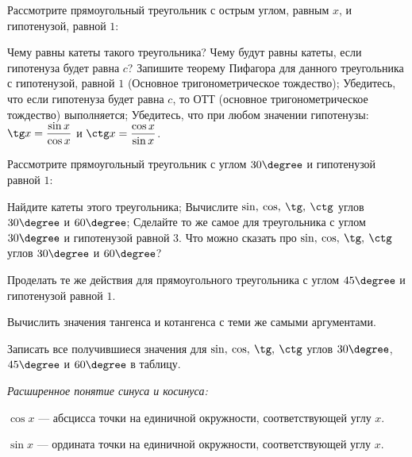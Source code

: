 \begin{class}[number=3]
	\begin{listofex}
		\item Рассмотрите прямоугольный треугольник с острым углом, равным \( x \), и гипотенузой, равной \( 1 \):
		\begin{tasks}
			\task Чему равны катеты такого треугольника?
			\task Чему будут равны катеты, если гипотенуза будет равна \( c \)?
			\task Запишите теорему Пифагора для данного треугольника с гипотенузой, равной \( 1 \) (Основное тригонометрическое тождество);
			\task Убедитесь, что если гипотенуза будет равна \( c \), то ОТТ (основное тригонометрическое тождество) выполняется;
			\task Убедитесь, что при любом значении гипотенузы: \( \tg x = \dfrac{\sin x}{\cos x} \) и \( \ctg x = \dfrac{\cos x}{\sin x} \).
		\end{tasks}
		\item Рассмотрите прямоугольный треугольник с углом \( 30\degree \) и гипотенузой равной \( 1 \):
		\begin{tasks}
			\task Найдите катеты этого треугольника;
			\task Вычислите \( \sin,\:\cos,\:\tg,\:\ctg \) углов \( 30\degree \) и \( 60\degree \);
			\task Сделайте то же самое для треугольника с углом \( 30\degree \) и гипотенузой равной \( 3 \). Что можно сказать про \( \sin,\:\cos,\:\tg,\:\ctg \) углов \( 30\degree \) и \( 60\degree \)?
		\end{tasks}
		\item Проделать те же действия для прямоугольного треугольника с углом \( 45\degree \) и гипотенузой равной \( 1 \).
		\item Вычислить значения тангенса и котангенса с теми же самыми аргументами.
		\item Записать все получившиеся значения для \( \sin,\:\cos,\:\tg,\:\ctg \) углов \( 30\degree \), \( 45\degree \) и \( 60\degree \) в таблицу.
		\item 	\textit{Расширенное понятие синуса и косинуса:}\\[0.5em]
	\end{listofex}
		\begin{definit}
			\textbf{\boldmath\( {\cos x} \)} --- абсцисса точки на единичной окружности, соответствующей углу \( x \).
		\end{definit}
		\begin{definit}
			\textbf{\boldmath\( \sin x \)} --- ордината точки на единичной окружности, соответствующей углу \( x \).
		\end{definit}

\end{class}
